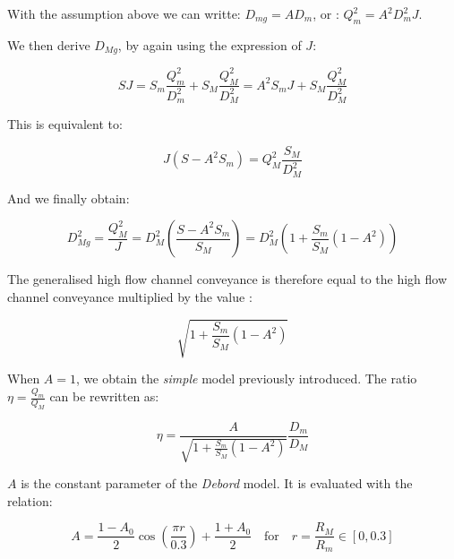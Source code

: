 \vspace{0.5cm}

With the assumption above we can writte: $D_{mg} = A D_m$, or : $Q_{m}^2 = A^2 D_{m}^2 J$.

\vspace{0.5cm}

We then derive $D_{Mg}$, by again using the expression of $J$:

\begin{equation}
  S J = S_m \frac{Q_{m}^2}{D_{m}^2} + S_M \frac{Q_{M}^2}{D_{M}^2} = A^2 S_m J + S_M \frac{Q_{M}^2}{D_{M}^2}
\end{equation}

This is equivalent to:

\begin{equation}
  J ( S - A^2 S_m ) = Q_{M}^2 \frac{S_M}{D_{M}^2}
\end{equation}

And we finally obtain:

\begin{equation}
  D_{Mg}^2 = \frac{Q_{M}^2}{J} = D_{M}^2 \left ( \frac{S - A^2 S_m}{S_M}  \right ) = D_{M}^2 \left ( 1 + \frac{S_m}{S_M} ( 1 - A^2 )  \right )
\end{equation}

\vspace{0.5cm}

The generalised high flow channel conveyance is therefore equal to the high flow channel conveyance multiplied by the value : 

$$
 \sqrt{1 + \frac{S_m}{S_M}(1-A^2)}
$$

\vspace{0.5cm}

When $A = 1$, we obtain the \textit{simple} model previously introduced. The ratio $\eta = \frac{Q_m}{Q_M}$ can be rewritten as:

\begin{equation}
  \eta = \frac{A}{\displaystyle \sqrt{1+\frac{S_m}{S_M}(1-A^2)}} \frac{D_m}{D_M}
\end{equation}

\vspace{0.5cm}

$A$ is the constant parameter of the \emph{Debord} model. It is evaluated with the relation:

\begin{equation}
  A = \frac{1-A_0}{2}\cos \left ( \frac{\pi r}{0.3} \right ) + \frac{1+A_0}{2} \quad \mbox{for} \quad r = \frac{R_M}{R_m} \in [0,0.3] 
\end{equation}

